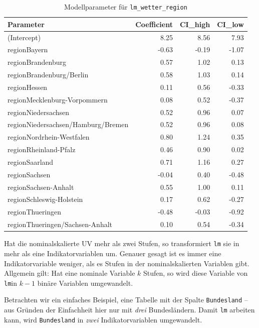 \documentclass[
  letterpaper,
  oneside,
  open=any]{scrbook}
\theoremstyle{definition}
\theoremstyle{definition}
\theoremstyle{definition}
\theoremstyle{remark}
\begin{document}
\begin{longtable}[]{@{}lrrr@{}}

\caption{\label{tbl-lm_wetter_region}Modellparameter für
\texttt{lm\_wetter\_region}}

\tabularnewline

\toprule\noalign{}
Parameter & Coefficient & CI\_high & CI\_low \\
\midrule\noalign{}
\endhead
\bottomrule\noalign{}
\endlastfoot
(Intercept) & 8.25 & 8.56 & 7.93 \\
regionBayern & -0.63 & -0.19 & -1.07 \\
regionBrandenburg & 0.57 & 1.02 & 0.13 \\
regionBrandenburg/Berlin & 0.58 & 1.03 & 0.14 \\
regionHessen & 0.11 & 0.56 & -0.33 \\
regionMecklenburg-Vorpommern & 0.08 & 0.52 & -0.37 \\
regionNiedersachsen & 0.52 & 0.96 & 0.07 \\
regionNiedersachsen/Hamburg/Bremen & 0.52 & 0.96 & 0.08 \\
regionNordrhein-Westfalen & 0.80 & 1.24 & 0.35 \\
regionRheinland-Pfalz & 0.46 & 0.90 & 0.02 \\
regionSaarland & 0.71 & 1.16 & 0.27 \\
regionSachsen & -0.04 & 0.40 & -0.48 \\
regionSachsen-Anhalt & 0.55 & 1.00 & 0.11 \\
regionSchleswig-Holstein & 0.17 & 0.62 & -0.27 \\
regionThueringen & -0.48 & -0.03 & -0.92 \\
regionThueringen/Sachsen-Anhalt & 0.10 & 0.54 & -0.34 \\

\end{longtable}

Hat die nominalskalierte UV mehr als zwei Stufen, so transformiert
\texttt{lm} sie in mehr als eine Indikatorvariablen um. Genauer gesagt
ist es immer eine Indikatorvariable weniger, als es Stufen in der
nominalskalierten Variablen gibt. Allgemein gilt: Hat eine nominale
Variable \(k\) Stufen, so wird diese Variable von \texttt{lm}in \(k-1\)
binäre Variablen umgewandelt.

Betrachten wir ein einfaches Beispiel, eine Tabelle mit der Spalte
\texttt{Bundesland} -- aus Gründen der Einfachheit hier nur mit
\emph{drei} Bundesländern. Damit \texttt{lm} arbeiten kann, wird
\texttt{Bundesland} in \emph{zwei} Indikatorvariablen umgewandelt.
\end{document}
